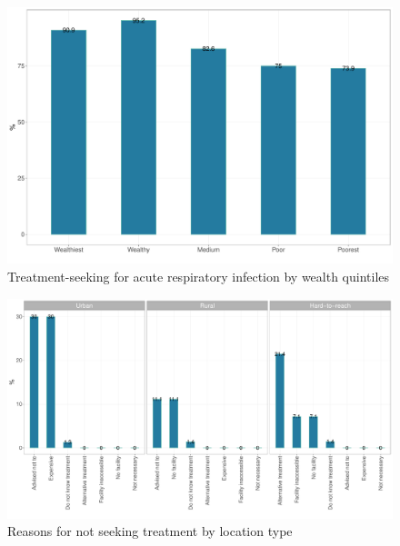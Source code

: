 \documentclass[12pt,a4paper]{article}
\begin{document}
\begin{figure}[H]

{\centering \includegraphics{kayinReport_files/figure-latex/ari2plot-1} 

}

\caption{Treatment-seeking for acute respiratory infection by wealth quintiles}\label{fig:ari2plot}
\end{figure}

\begin{figure}[H]

{\centering \includegraphics{kayinReport_files/figure-latex/ari4plot-1} 

}

\caption{Reasons for not seeking treatment by location type}\label{fig:ari4plot}
\end{figure}
\end{document}
